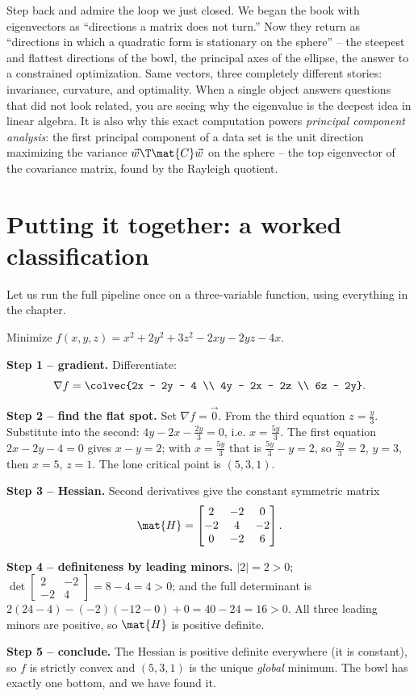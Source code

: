 \begin{aestheticbox}
Step back and admire the loop we just closed. We began the book with eigenvectors as
``directions a matrix does not turn.'' Now they return as ``directions in which a
quadratic form is stationary on the sphere'' -- the steepest and flattest directions
of the bowl, the principal axes of the ellipse, the answer to a constrained
optimization. Same vectors, three completely different stories: invariance,
curvature, and optimality. When a single object answers questions that did not look
related, you are seeing why the eigenvalue is the deepest idea in linear algebra. It
is also why this exact computation powers \emph{principal component analysis}: the
first principal component of a data set is the unit direction maximizing the variance
$\vec{w}\T\mat{C}\vec{w}$ on the sphere -- the top eigenvector of the covariance
matrix, found by the Rayleigh quotient.
\end{aestheticbox}

\section{Putting it together: a worked classification}
\label{ch36:worked}

Let us run the full pipeline once on a three-variable function, using everything in
the chapter.

\begin{example}
\label{ch36:ex-endtoend}
Minimize $f(x,y,z) = x^2 + 2y^2 + 3z^2 - 2xy - 2yz - 4x$.

\textbf{Step 1 -- gradient.} Differentiate:
\[
  \nabla f = \colvec{2x - 2y - 4 \\ 4y - 2x - 2z \\ 6z - 2y}.
\]

\textbf{Step 2 -- find the flat spot.} Set $\nabla f = \vec0$. From the third
equation $z=\tfrac{y}{3}$. Substitute into the second: $4y-2x-\tfrac{2y}{3}=0$, i.e.
$x=\tfrac{5y}{3}$. The first equation $2x-2y-4=0$ gives $x-y=2$; with $x=\tfrac{5y}3$
that is $\tfrac{5y}{3}-y=2$, so $\tfrac{2y}{3}=2$, $y=3$, then $x=5$, $z=1$. The lone
critical point is $(5,3,1)$.

\textbf{Step 3 -- Hessian.} Second derivatives give the constant symmetric matrix
\[
  \mat{H}=\begin{bmatrix} 2 & -2 & 0 \\ -2 & 4 & -2 \\ 0 & -2 & 6 \end{bmatrix}.
\]

\textbf{Step 4 -- definiteness by leading minors.} $|2|=2>0$;
$\det\begin{bmatrix}2&-2\\-2&4\end{bmatrix}=8-4=4>0$; and the full determinant is
$2(24-4) - (-2)(-12-0) + 0 = 40 - 24 = 16 > 0$. All three leading minors are
positive, so $\mat{H}$ is positive definite.

\textbf{Step 5 -- conclude.} The Hessian is positive definite everywhere (it is
constant), so $f$ is strictly convex and $(5,3,1)$ is the unique \emph{global}
minimum. The bowl has exactly one bottom, and we have found it.
\end{example}


